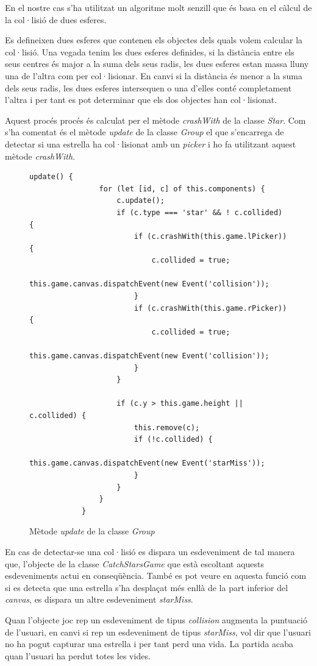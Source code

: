 \documentclass[12pt,a4paper,catalan]{article}
\begin{document}
	En el nostre cas s'ha utilitzat un algoritme molt senzill que és basa en el càlcul de la col·lisió de dues esferes.
	
	Es defineixen dues esferes que contenen els objectes dels quals volem calcular la col·lisió. Una vegada tenim les dues esferes definides, si la distància entre els seus centres és major a la suma dels seus radis, les dues esferes estan massa lluny una de l'altra com per col·lisionar. En canvi si la distància és menor a la suma dels seus radis, les dues esferes intersequen o una d'elles conté completament l'altra i per tant es pot determinar que els dos objectes han col·lisionat.
	
	Aquest procés procés és calculat per el mètode \textit{crashWith} de la classe \textit{Star}. Com s'ha comentat és el mètode \textit{update} de la classe \textit{Group} el que s'encarrega de detectar si una estrella ha col·lisionat amb un \textit{picker} i ho fa utilitzant aquest mètode \textit{crashWith}.
	\begin{figure}[H]
		\begin{lstlisting}[gobble=12, tabsize=4]
			update() {
				for (let [id, c] of this.components) {
					c.update();
					if (c.type === 'star' && ! c.collided) {
						if (c.crashWith(this.game.lPicker)) {
							c.collided = true;
							this.game.canvas.dispatchEvent(new Event('collision'));
						}
						if (c.crashWith(this.game.rPicker)) {
							c.collided = true;
							this.game.canvas.dispatchEvent(new Event('collision'));
						}
					}
					
					if (c.y > this.game.height || c.collided) {
						this.remove(c);
						if (!c.collided) {
							this.game.canvas.dispatchEvent(new Event('starMiss'));
						}
					}
				}
			}
		\end{lstlisting}
		\caption{Mètode \textit{update} de la classe \textit{Group}}
		\label{fig:group-update}
	\end{figure}
	En cas de detectar-se una col·lisió es dispara un esdeveniment de tal manera que, l'objecte de la classe \textit{CatchStarsGame} que està escoltant aquests esdeveniments actui en conseqüència. També es pot veure en aquesta funció com si es detecta que una estrella s'ha desplaçat més enllà de la part inferior del \textit{canvas}, es dispara un altre esdeveniment \textit{starMiss}.
	
	Quan l'objecte joc rep un esdeveniment de tipus \textit{collision} augmenta la puntuació de l'usuari, en canvi si rep un esdeveniment de tipus \textit{starMiss}, vol dir que l'usuari no ha pogut capturar una estrella i per tant perd una vida. La partida acaba quan l'usuari ha perdut totes les vides.
\end{document}
